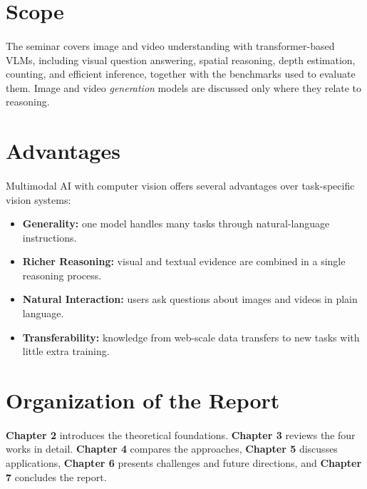 \documentclass[12pt,a4paper,final]{extreport}
\begin{document}
\section{Scope}

\paragraph{} The seminar covers image and video understanding with transformer-based VLMs, including visual question answering, spatial reasoning, depth estimation, counting, and efficient inference, together with the benchmarks used to evaluate them. Image and video \emph{generation} models are discussed only where they relate to reasoning.

\section{Advantages}

\paragraph{} Multimodal AI with computer vision offers several advantages over task-specific vision systems:
\begin{itemize}
  \item \textbf{Generality:} one model handles many tasks through natural-language instructions.
  \item \textbf{Richer Reasoning:} visual and textual evidence are combined in a single reasoning process.
  \item \textbf{Natural Interaction:} users ask questions about images and videos in plain language.
  \item \textbf{Transferability:} knowledge from web-scale data transfers to new tasks with little extra training.
\end{itemize}

\section{Organization of the Report}

\paragraph{} \textbf{Chapter 2} introduces the theoretical foundations. \textbf{Chapter 3} reviews the four works in detail. \textbf{Chapter 4} compares the approaches, \textbf{Chapter 5} discusses applications, \textbf{Chapter 6} presents challenges and future directions, and \textbf{Chapter 7} concludes the report.
\end{document}
